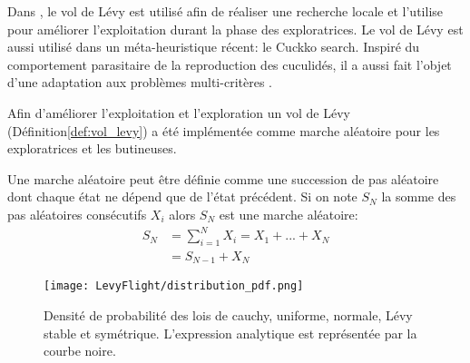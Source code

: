 Dans \cite{Sharma2012213}, le vol de Lévy est utilisé afin de réaliser une recherche locale
et \cite{Hakli2013254} l’utilise pour améliorer l’exploitation durant la phase des exploratrices.
Le vol de Lévy est aussi utilisé dans un méta-heuristique récent: le Cuckko search.
Inspiré du comportement parasitaire de la reproduction des cuculidés, il a aussi fait l’objet
d’une adaptation aux problèmes multi-critères \parencite{Yang20131616}.

Afin d’améliorer l’exploitation et l’exploration un vol de Lévy (Définition\ref{def:vol_levy})
a été implémentée comme marche aléatoire pour les exploratrices et les butineuses.

\begin{Def}\label{def:marche_aleatoire}
Une marche aléatoire \parencite{Yang201445} peut être définie comme une succession de pas
aléatoire dont chaque état ne dépend que de l’état précédent. Si on note $S_{N}$
la somme des pas aléatoires consécutifs $X_{i}$ alors $S_{N}$ est une marche aléatoire:
\begin{equation}\label{eq:marche_aleatoire}
    \begin{split}
        S_{N} &= \sum_{i=1}^{N} X_{i} = X_{1} + ... + X_{N}\\
              &= S_{N-1} + X_{N}
    \end{split}
\end{equation}
\end{Def}

\begin{figure}
    \begin{center}
        \texttt{[image: LevyFlight/distribution\_pdf.png]}
    \end{center}
    \caption{Densité de probabilité des lois de cauchy, uniforme, normale, Lévy stable et symétrique.
             L’expression analytique est représentée par la courbe noire.
             \label{fig:distribution_pdf}}
\end{figure}

